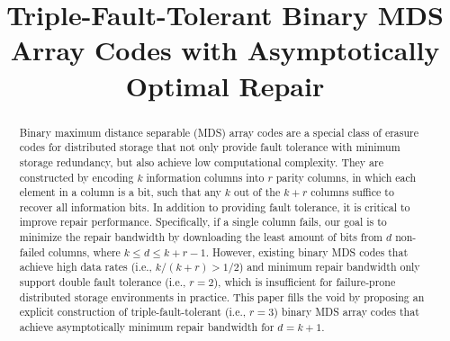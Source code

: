 \documentclass[conference]{IEEEtran}
\begin{document}
\title{Triple-Fault-Tolerant Binary MDS Array Codes with Asymptotically
Optimal Repair}
\maketitle

\begin{abstract}
Binary maximum distance separable (MDS) array codes are a special class of
erasure codes for distributed storage that not only provide fault tolerance
with minimum storage redundancy, but also achieve low computational
complexity.  They are constructed by encoding $k$ information columns into $r$
parity columns, in which each element in a column is a bit, such that any $k$
out of the $k+r$ columns suffice to recover all information bits.  In addition
to providing fault tolerance, it is critical to improve repair performance.
Specifically, if a single column fails, our goal is to minimize the repair
bandwidth by downloading the least amount of bits from $d$ non-failed columns,
where $k\le d\le k+r-1$.  However, existing binary MDS codes that achieve high
data rates (i.e., $k/(k+r) > 1/2$) and minimum repair bandwidth only support
double fault tolerance (i.e., $r=2$), which is insufficient for failure-prone
distributed storage environments in practice. This paper fills the void by
proposing an explicit construction of triple-fault-tolerant (i.e., $r=3$)
binary MDS array codes that achieve asymptotically minimum repair bandwidth
for $d=k+1$.
\end{abstract}
\end{document}
